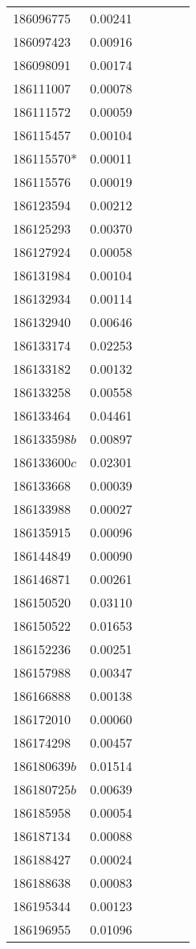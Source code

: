 \begin{landscape}
\begin{longtable}{p{1.8cm}p{2cm}p{2.2cm}p{1cm}p{2.8cm}p{12.3cm}}
\midrule
186096775&0.00241&&&& \\
186097423&0.00916&&&& \\
186098091&0.00174&&&& \\
186111007&0.00078&&&& \\
186111572&0.00059&&&& \\
186115457&0.00104&&&& \\
186115570*&0.00011&&&& \\
186115576&0.00019&&&& \\
186123594&0.00212&&&& \\
186125293&0.00370&&&& \\
186127924&0.00058&&&& \\
186131984&0.00104&&&& \\
186132934&0.00114&&&& \\
186132940&0.00646&&&& \\
186133174&0.02253&&&& \\
186133182&0.00132&&&& \\
186133258&0.00558&&&& \\
186133464&0.04461&&&& \\
186133598$b$&0.00897&&&& \\
186133600$c$&0.02301&&&& \\
186133668&0.00039&&&& \\
186133988&0.00027&&&& \\
186135915&0.00096&&&& \\
186144849&0.00090&&&& \\
186146871&0.00261&&&& \\
186150520&0.03110&&&& \\
186150522&0.01653&&&& \\
186152236&0.00251&&&& \\
186157988&0.00347&&&& \\
186166888&0.00138&&&& \\
186172010&0.00060&&&& \\
186174298&0.00457&&&& \\
186180639$b$&0.01514&&&& \\
186180725$b$&0.00639&&&& \\
186185958&0.00054&&&& \\
186187134&0.00088&&&& \\
186188427&0.00024&&&& \\
186188638&0.00083&&&& \\
186195344&0.00123&&&& \\
186196955&0.01096&&&& \\

\end{longtable}
\end{landscape}
